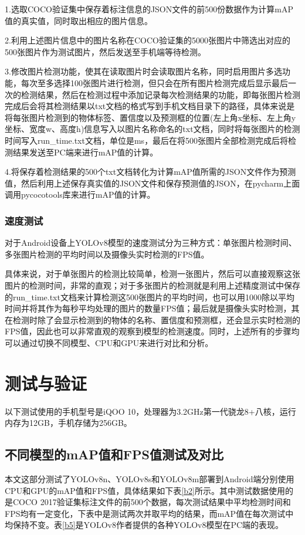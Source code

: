 \documentclass{ctexart}
\numberwithin{equation}{section}%
\numberwithin{figure}{section}%
\numberwithin{table}{section}%
\begin{document}
	1.选取COCO验证集中保存着标注信息的JSON文件的前500份数据作为计算mAP值的真实值，同时取出相应的图片信息。

	2.利用上述图片信息中的图片名称在COCO验证集的5000张图片中筛选出对应的500张图片作为测试图片，然后发送至手机端等待检测。

	3.修改图片检测功能，使其在读取图片时会读取图片名称，同时启用图片多选功能，每次至多选择100张图片进行检测，但只会在所有图片检测完成后显示最后一次的检测结果，然后在检测过程中添加记录每次检测结果的功能，即每张图片检测完成后会将其检测结果以txt文档的格式写到手机文档目录下的路径，具体来说是将每张图片检测到的物体标签、置信度以及预测框的位置(左上角x坐标、左上角y坐标、宽度w、高度h)信息写入以图片名称命名的txt文档，同时将每张图片的检测时间写入run\_time.txt文档，单位是ms，最后在将500张图片全部检测完成后将检测结果发送至PC端来进行mAP值的计算。
	
	
	4.将保存着检测结果的500个txt文档转化为计算mAP值所需的JSON文件作为预测值，然后利用上述保存真实值的JSON文件和保存预测值的JSON，在pycharm上面调用pycocotools库来进行mAP值的计算。
	
	\subsubsection{速度测试}
	对于Android设备上YOLOv8模型的速度测试分为三种方式：单张图片检测时间、多张图片检测的平均时间以及摄像头实时检测的FPS值。
	
	具体来说，对于单张图片的检测比较简单，检测一张图片，然后可以直接观察这张图片的检测时间，非常的直观；对于多张图片的检测就是利用上述精度测试中保存的run\_time.txt文档来计算检测这500张图片的平均时间，也可以用1000除以平均时间并将其作为每秒平均处理的图片的数量FPS值；最后就是摄像头实时检测，其在检测时除了会显示检测到的物体的名称、置信度和预测框，还会显示实时检测的FPS值，因此也可以非常直观的观察到模型的检测速度。同时，上述所有的步骤均可以通过切换不同模型、CPU和GPU来进行对比和分析。
	
%	
	\newpage
	\section{测试与验证}
	以下测试使用的手机型号是iQOO 10，处理器为3.2GHz第一代骁龙8+八核，运行内存为12GB，手机存储为256GB。
	\subsection{不同模型的mAP值和FPS值测试及对比}
	本文这部分测试了YOLOv8n、YOLOv8s和YOLOv8m部署到Android端分别使用CPU和GPU的mAP值和FPS值，具体结果如下表\ref{b2}所示。其中测试数据使用的是COCO 2017验证集标注文件的前500个数据，每次测试结果中平均检测时间和FPS均有一定变化，下表中是测试两次并取平均的结果，而mAP值在每次测试中均保持不变。表\ref{b5}是YOLOv8作者提供的各种YOLOv8模型在PC端的表现。
	
\end{document}

